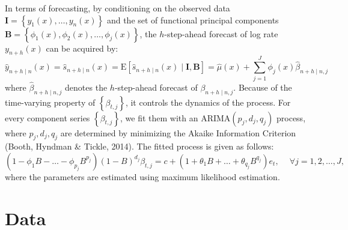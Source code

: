 \documentclass[11pt,a4paper,]{article}
\begin{document}
In terms of forecasting, by conditioning on the observed data \(\bm{I}=\left\{{y_1(x),\dots,y_n(x)}\right\}\) and the set of functional principal components \(\bm{B}=\left\{{\phi_1(x),\phi_2(x),\dots,\phi_j(x)}\right\}\), the \(h\)-step-ahead forecast of log rate \(y_{n+h}(x)\) can be acquired by:
\vspace{-.2in}
\begin{equation}
  \widehat{y}_{n+h\mid n}(x)=\widehat{s}_{n+h\mid n}(x) = \text{E}[\widehat{s}_{n+h\mid n}(x)\mid \bm{I, B}] = \widehat{\mu}(x)+\sum_{j=1}^{J}\phi_j(x)\widehat{\beta}_{n+h\mid n,j}
\end{equation}
where \(\widehat{\beta}_{n+h\mid n,j}\) denotes the \(h\)-step-ahead forecast of \(\beta_{n+h\mid n,j}\). Because of the time-varying property of \(\left\{\beta_{t,j}\right\}\), it controls the dynamics of the process. For every component series \(\left\{\beta_{t,j}\right\}\), we fit them with an ARIMA\((p_j,d_j,q_j)\) process, where \(p_j,d_j,q_j\) are determined by minimizing the Akaike Information Criterion (Booth, Hyndman \& Tickle, 2014). The fitted process is given as follows:
\vspace{-.3in}
\begin{equation*}
  (1-\phi_1B-\dots-\phi_{p_j}B^{p_j})(1-B)^{d_j}\beta_{t,j}=c+(1+\theta_1B+\dots+\theta_{q_j}B^{q_j})e_t, \quad ~\forall j=1,2,\dots,J,
\end{equation*}
where the parameters are estimated using maximum likelihood estimation.

\hypertarget{sec:data}{%
\section{Data}\label{sec:data}}
\end{document}
